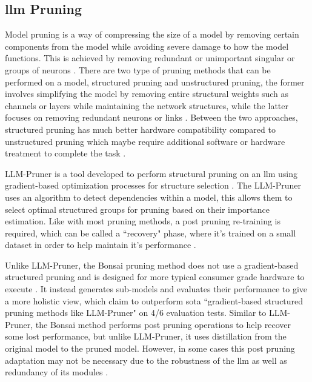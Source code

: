 \documentclass{ifacconf}
\begin{document}
	\subsection{\gls{llm} Pruning}
	Model pruning is a way of compressing the size of a model by removing certain components from the model while avoiding severe damage to how the model functions. This is achieved by removing redundant or unimportant singular or groups of neurons \cite{huang2024largelanguagemodelpruning}. There are two type of pruning methods that can be performed on a model, structured pruning and unstructured pruning, the former involves simplifying the model by removing entire structural weights such as channels or layers while maintaining the network structures, while the latter focuses on removing redundant neurons or links \cite{huang2024largelanguagemodelpruning}. Between the two approaches, structured pruning has much better hardware compatibility compared to unstructured pruning which maybe require additional software or hardware treatment to complete the task \cite{huang2024largelanguagemodelpruning}.
	
	LLM-Pruner is a tool developed to perform structural pruning on an \gls{llm} using gradient-based optimization processes for structure selection \cite{ma2023llmprunerstructuralpruninglarge}. The LLM-Pruner uses an algorithm to detect dependencies within a model, this allows them to select optimal structured groups for pruning based on their importance estimation. Like with most pruning methods, a post pruning re-training is required, which can be called a ``recovery" phase, where it's trained on a small dataset in order to help maintain it's performance \cite{ma2023llmprunerstructuralpruninglarge}.
	
	Unlike LLM-Pruner, the Bonsai pruning method does not use a gradient-based structured pruning and is designed for more typical consumer grade hardware to execute \cite{dery2024everybodyprunenowstructured}. It instead generates sub-models and evaluates their performance to give a more holistic view, which claim to outperform \gls{sota} ``gradient-based structured pruning methods like LLM-Pruner" \cite[p.~2]{dery2024everybodyprunenowstructured} on 4/6 evaluation tests. Similar to LLM-Pruner, the Bonsai method performs post pruning operations to help recover some lost performance, but unlike LLM-Pruner, it uses distillation from the original model to the pruned model. However, in some cases this post pruning adaptation may not be necessary due to the robustness of the \gls{llm} as well as redundancy of its modules \cite{dery2024everybodyprunenowstructured}.
	
\end{document}
